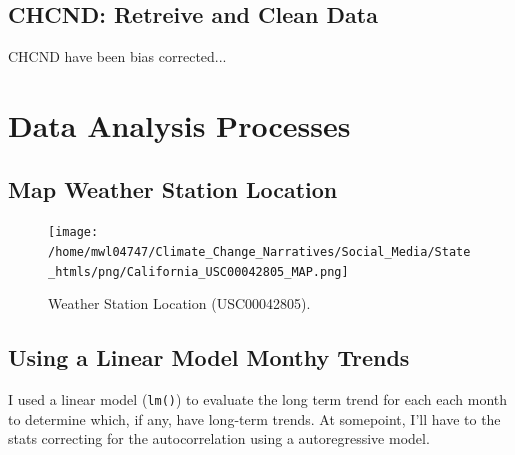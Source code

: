 \documentclass{article}
\begin{document}
\begin{itemize}
\subsection{CHCND: Retreive and Clean Data}

CHCND have been bias corrected...


\section{Data Analysis Processes}

\subsection{Map Weather Station Location}

\begin{knitrout}
\color{fgcolor}\begin{kframe}


{\ttfamily\noindent\bfseries\color{errorcolor}{\#\# Error in eval(expr, envir, enclos): object 'AIzaSyDYUc3ExxqFTOHtyxyr6' not found}}

{\ttfamily\noindent\bfseries\color{errorcolor}{\#\# Error: Google now requires an API key.\\\#\# \ \ \ \ \ \ \ See ?register\_google for details.}}

{\ttfamily\noindent\bfseries\color{errorcolor}{\#\# Error in ggmap(myMap): object 'myMap' not found}}\end{kframe}
\end{knitrout}




\begin{figure}
\texttt{[image: /home/mwl04747/Climate\_Change\_Narratives/Social\_Media/State\_htmls/png/California\_USC00042805\_MAP.png]}
\caption{Weather Station Location (USC00042805). }
\label{fig:Map}
\end{figure}

\subsection{Using a Linear Model Monthy Trends}

I used a linear model (\texttt{lm()}) to evaluate the long term trend for each each month to determine which, if any, have long-term trends. At somepoint, I'll have to the stats correcting for the autocorrelation using a autoregressive model.  

\begin{knitrout}
\color{fgcolor}\begin{kframe}



\end{kframe}
\end{knitrout}
\end{itemize}
\end{document}
